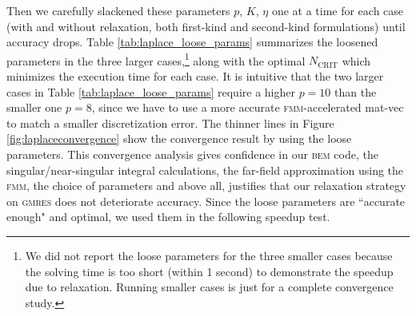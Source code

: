\documentclass[final,3p,times]{elsarticle}
\newcommand{\bem}{\textsc{bem}\xspace}
\newcommand{\fmm}{\textsc{fmm}\xspace}
\newcommand{\ncrit}{N_{\text{CRIT}}}
\newcommand{\gmres}{\textsc{gmres}\xspace}
\begin{document}
Then we carefully slackened these parameters $p$, $K$, $\eta$ one at a time for each case (with and without relaxation, both first-kind and second-kind formulations) until accuracy drops. Table \ref{tab:laplace_loose_params} summarizes the loosened parameters in the three larger cases,\footnote{We did not report the loose parameters for the three smaller cases because the solving time is too short (within 1 second) to demonstrate the speedup due to relaxation. Running smaller cases is just for a complete convergence study.} along with the optimal $\ncrit$ which minimizes the execution time for each case. It is intuitive that the two larger cases in Table \ref{tab:laplace_loose_params} require a higher $p=10$ than the smaller one $p=8$, since we have to use a more accurate \fmm-accelerated mat-vec to match a smaller discretization error. The thinner lines in Figure \ref{fig:laplaceconvergence} show the convergence result by using the loose parameters. This convergence analysis gives confidence in our \bem code, the singular/near-singular integral calculations, the far-field approximation using the \fmm, the choice of parameters and above all, justifies that our relaxation strategy on \gmres does not deteriorate accuracy. Since the loose parameters are ``accurate enough" and optimal, we used them in the following speedup test. 
\end{document}
